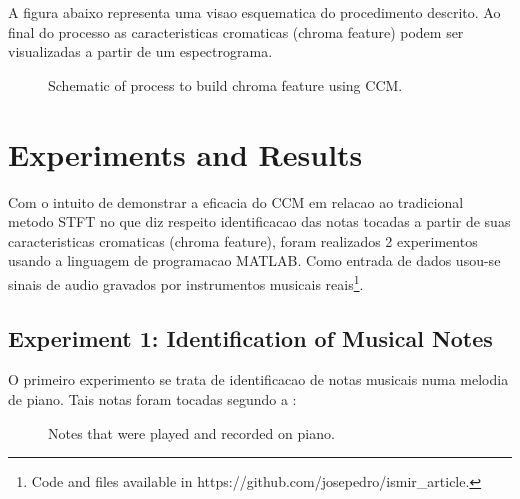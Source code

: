 \documentclass{article}
\begin{document}
	A figura abaixo representa uma visao esquematica do procedimento descrito. Ao final do processo as caracteristicas cromaticas (chroma feature) podem ser visualizadas a partir de um espectrograma.

	\begin{figure}[h]
	 \centerline{}
	 \caption{Schematic of process to build chroma feature using CCM.}
	 \label{fig:schematic}
	\end{figure}


\section{Experiments and Results}

	Com o intuito de demonstrar a eficacia do CCM em relacao ao tradicional metodo STFT\cite{LabROSA} no que diz respeito identificacao das notas tocadas a partir de suas caracteristicas cromaticas (chroma feature),  foram realizados 2 experimentos usando a linguagem de programacao MATLAB. Como entrada de dados usou-se sinais de audio gravados por instrumentos musicais reais\footnote{Code and files available in https://github.com/josepedro/ismir\_article.}. 

	\subsection{Experiment 1: Identification of Musical Notes}

	O primeiro experimento se trata de identificacao de notas musicais numa melodia de piano. Tais notas foram tocadas segundo a : 

	\begin{figure}[h]
	 \centerline{}
	 \caption{Notes that were played and recorded on piano.}
	 \label{fig:1-notes}
	\end{figure}
\end{document}
